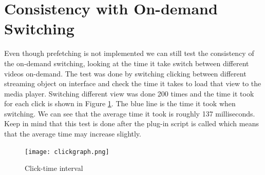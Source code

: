 \section{Consistency with On-demand Switching}
Even though prefetching is not implemented we can still test the consistency of the on-demand switching, looking at the time it take switch between different videos on-demand. The test was done by switching clicking between different streaming object on interface and check the time it takes to load that view to the media player. Switching different view was done 200 times and the time it took for each click is shown in Figure \ref{fig:clickgraph}. The blue line is the time it took when switching. We can see that the average time it took is roughly 137 milliseconds. Keep in mind that this test is done after the plug-in script is called which means that the average time may increase slightly. 

\begin{figure}[ht!]
\begin{center}
	\texttt{[image: clickgraph.png]}
	\caption{Click-time interval}
	\label{fig:clickgraph}
\end{center}
\end{figure}